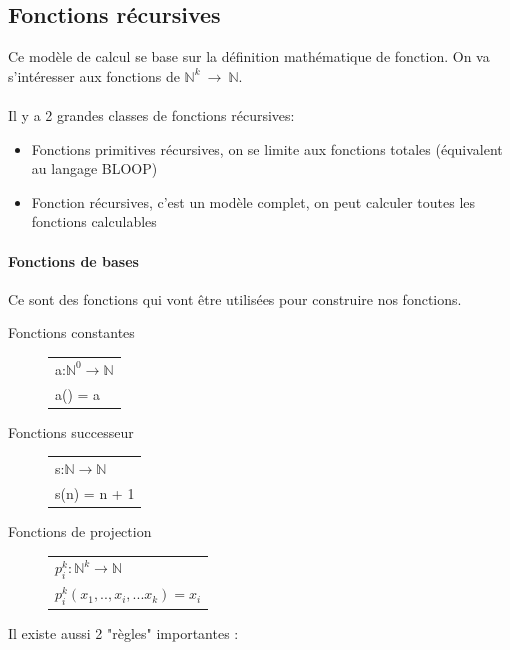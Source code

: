 \documentclass[11pt,a4paper]{article}
\newcommand{\N}{\mathbb{N}}
\theoremstyle{definition}
\begin{document}
\subsection{Fonctions récursives}
\label{sub:fonction_r_cursives}
Ce modèle de calcul se base sur la définition mathématique de fonction. On va 
s'intéresser aux fonctions de $\N^k \ \rightarrow \ \N$.

\paragraph{} Il y a 2 grandes classes de fonctions récursives: 
\begin{itemize}
	\item Fonctions primitives récursives, on se limite aux fonctions totales 
		(équivalent au langage BLOOP)
	\item Fonction récursives, c'est un modèle complet, on peut calculer 
		toutes les fonctions calculables 
\end{itemize}

\paragraph{Fonctions de bases} Ce sont des fonctions qui vont être utilisées 
pour construire nos fonctions.

\begin{description}
	\item[Fonctions constantes] 
		\begin{tabular}{|l|}
			\hline
			a:$\N^0 \rightarrow \N$\\
			a() = a\\
			\hline
		\end{tabular}
	\item[Fonctions successeur] 
		\begin{tabular}{|l|}
			\hline
			s:$\N \rightarrow \N$\\
			s(n) = n + 1\\
			\hline
		\end{tabular}
	\item[Fonctions de projection] 
		\begin{tabular}{|l|}
			\hline
			$p^k_i: \N^k \rightarrow \N$\\
			$p^k_i(x_1,..,x_i,...x_k) = x_i$\\
			\hline
		\end{tabular}
\end{description}

Il existe aussi 2 "règles" importantes :
\end{document}
